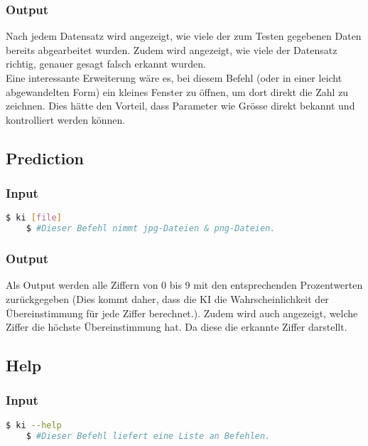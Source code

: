 \subsubsection{Output}
\label{sec:TestOutput}
Nach jedem Datensatz wird angezeigt, wie viele der zum Testen gegebenen Daten bereits abgearbeitet wurden. Zudem wird angezeigt, wie viele der Datensatz richtig, genauer gesagt falsch erkannt wurden. 
\\
Eine interessante Erweiterung wäre es, bei diesem Befehl (oder in einer leicht abgewandelten Form) ein kleines Fenster zu öffnen, um dort direkt die Zahl zu zeichnen. Dies hätte den Vorteil, dass Parameter wie Grösse direkt bekannt und kontrolliert werden können.

\subsection{Prediction}
\label{sec:DesignAnwendung}
\subsubsection{Input}
\label{sec:DesignUseInput}
\begin{lstlisting}[language=bash]
	$ ki [file]
	$ #Dieser Befehl nimmt jpg-Dateien & png-Dateien.
\end{lstlisting}

\subsubsection{Output}
\label{sec:DesignUseOutput}
Als Output werden alle Ziffern von 0 bis 9 mit den entsprechenden Prozentwerten zurückgegeben (Dies kommt daher, dass die KI die Wahrscheinlichkeit der Übereinstimmung für jede Ziffer berechnet.). Zudem wird auch angezeigt, welche Ziffer die höchste Übereinstimmung hat. Da diese die erkannte Ziffer darstellt.

\subsection{Help}
\label{sec:DesignHelp}
\subsubsection{Input}
\label{sec:DesignHelpInput}
\begin{lstlisting}[language=bash]
	$ ki --help
	$ #Dieser Befehl liefert eine Liste an Befehlen.
\end{lstlisting}

